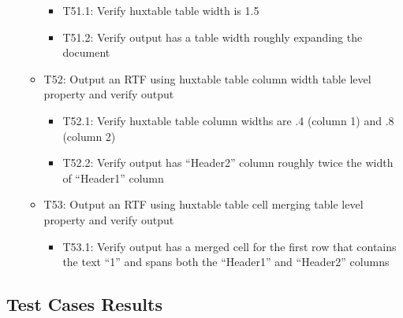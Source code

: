 \documentclass[]{article}
\providecommand{\tightlist}{%
  \setlength{\itemsep}{0pt}\setlength{\parskip}{0pt}}
\begin{document}
\begin{itemize}
\begin{itemize}
    \begin{itemize}
    \tightlist
    \item
      T51.1: Verify huxtable table width is 1.5
    \item
      T51.2: Verify output has a table width roughly expanding the
      document
    \end{itemize}
  \item
    T52: Output an RTF using huxtable table column width table level
    property and verify output

    \begin{itemize}
    \tightlist
    \item
      T52.1: Verify huxtable table column widths are .4 (column 1) and
      .8 (column 2)
    \item
      T52.2: Verify output has ``Header2'' column roughly twice the
      width of ``Header1'' column
    \end{itemize}
  \item
    T53: Output an RTF using huxtable table cell merging table level
    property and verify output

    \begin{itemize}
    \tightlist
    \item
      T53.1: Verify output has a merged cell for the first row that
      contains the text ``1'' and spans both the ``Header1'' and
      ``Header2'' columns
    \end{itemize}
  \end{itemize}
\end{itemize}

\hypertarget{test-cases-results}{%
\subsection{Test Cases Results}\label{test-cases-results}}
\end{document}
